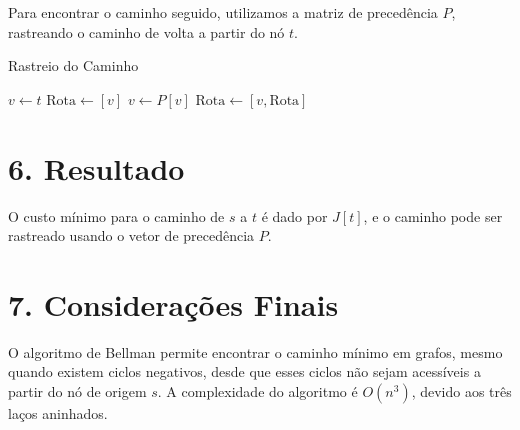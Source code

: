 \documentclass{article}
\begin{document}
Para encontrar o caminho seguido, utilizamos a matriz de precedência \( P \), rastreando o caminho de volta a partir do nó \( t \).
\begin{algorithm}
\caption{Rastreio do Caminho}
\begin{algorithmic}
\STATE $v \leftarrow t$
\STATE $\text{Rota} \leftarrow [v]$
\STATE $v \leftarrow P[v]$
\STATE $\text{Rota} \leftarrow [v, \text{Rota}]$
\ENDWHILE
\end{algorithmic}
\end{algorithm}

\section*{6. Resultado}
O custo mínimo para o caminho de \( s \) a \( t \) é dado por \( J[t] \), e o caminho pode ser rastreado usando o vetor de precedência \( P \).

\section*{7. Considerações Finais}
O algoritmo de Bellman permite encontrar o caminho mínimo em grafos, mesmo quando existem ciclos negativos, desde que esses ciclos não sejam acessíveis a partir do nó de origem \( s \). A complexidade do algoritmo é \( O(n^3) \), devido aos três laços aninhados.
\end{document}
